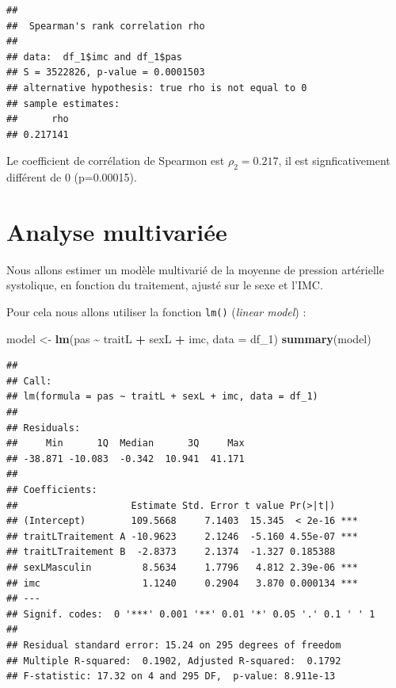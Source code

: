 \documentclass[
]{book}
\newenvironment{Shaded}{\begin{snugshade}}{\end{snugshade}}
\newcommand{\AttributeTok}[1]{\textcolor[rgb]{0.13,0.29,0.53}{#1}}
\newcommand{\FunctionTok}[1]{\textcolor[rgb]{0.13,0.29,0.53}{\textbf{#1}}}
\newcommand{\NormalTok}[1]{#1}
\newcommand{\OtherTok}[1]{\textcolor[rgb]{0.56,0.35,0.01}{#1}}
\newcommand{\SpecialCharTok}[1]{\textcolor[rgb]{0.81,0.36,0.00}{\textbf{#1}}}
\begin{document}
\begin{verbatim}
## 
##  Spearman's rank correlation rho
## 
## data:  df_1$imc and df_1$pas
## S = 3522826, p-value = 0.0001503
## alternative hypothesis: true rho is not equal to 0
## sample estimates:
##      rho 
## 0.217141
\end{verbatim}

Le coefficient de corrélation de Spearmon est \(\rho_2 = 0.217\), il est signficativement différent de 0 (p=0.00015).

\section{Analyse multivariée}\label{analyse-multivariuxe9e}

Nous allons estimer un modèle multivarié de la moyenne de pression artérielle systolique, en fonction du traitement, ajusté sur le sexe et l'IMC.

Pour cela nous allons utiliser la fonction \texttt{lm()} (\emph{linear model}) :

\begin{Shaded}
\begin{Highlighting}[]
\NormalTok{model }\OtherTok{\textless{}{-}} \FunctionTok{lm}\NormalTok{(pas }\SpecialCharTok{\textasciitilde{}}\NormalTok{ traitL }\SpecialCharTok{+}\NormalTok{ sexL }\SpecialCharTok{+}\NormalTok{ imc, }
            \AttributeTok{data =}\NormalTok{ df\_1)}
\FunctionTok{summary}\NormalTok{(model)}
\end{Highlighting}
\end{Shaded}

\begin{verbatim}
## 
## Call:
## lm(formula = pas ~ traitL + sexL + imc, data = df_1)
## 
## Residuals:
##     Min      1Q  Median      3Q     Max 
## -38.871 -10.083  -0.342  10.941  41.171 
## 
## Coefficients:
##                    Estimate Std. Error t value Pr(>|t|)    
## (Intercept)        109.5668     7.1403  15.345  < 2e-16 ***
## traitLTraitement A -10.9623     2.1246  -5.160 4.55e-07 ***
## traitLTraitement B  -2.8373     2.1374  -1.327 0.185388    
## sexLMasculin         8.5634     1.7796   4.812 2.39e-06 ***
## imc                  1.1240     0.2904   3.870 0.000134 ***
## ---
## Signif. codes:  0 '***' 0.001 '**' 0.01 '*' 0.05 '.' 0.1 ' ' 1
## 
## Residual standard error: 15.24 on 295 degrees of freedom
## Multiple R-squared:  0.1902, Adjusted R-squared:  0.1792 
## F-statistic: 17.32 on 4 and 295 DF,  p-value: 8.911e-13
\end{verbatim}
\end{document}
